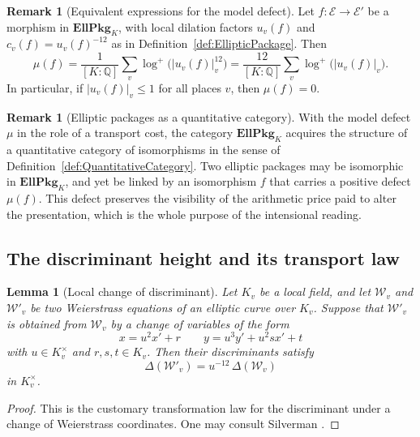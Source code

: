 \documentclass[10pt, reqno]{amsart}
\theoremstyle{plain}
\newtheorem{lemma}[theorem]{Lemma}
\theoremstyle{definition}
\newtheorem{remark}[theorem]{Remark}
\theoremstyle{plain}
\newcommand{\Q}{\mathbb{Q}}
\begin{document}
\begin{remark}[Equivalent expressions for the model defect]\label{rem:ModelDefectEquivalent}
Let $f \colon \mathcal{E}\to\mathcal{E}'$ be a morphism in $\mathbf{EllPkg}_K$, with local dilation factors $u_v(f)$ and $c_v(f)=u_v(f)^{-12}$ as in Definition~\ref{def:EllipticPackage}. Then
\[
\mu(f)
=
\frac{1}{[K:\Q]} \sum_v \log^{+}\!\bigl(|u_v(f)|_v^{12}\bigr)
=
\frac{12}{[K:\Q]} \sum_v \log^{+}\!\bigl(|u_v(f)|_v\bigr).
\]
In particular, if $|u_v(f)|_v\le 1$ for all places $v$, then $\mu(f)=0$.
\end{remark}

\begin{remark}[Elliptic packages as a quantitative category]\label{rem:EllPkgQuantitative}
With the model defect $\mu$ in the role of a transport cost, the category $\mathbf{EllPkg}_K$ acquires the structure of a quantitative category of isomorphisms in the sense of Definition~\ref{def:QuantitativeCategory}. Two elliptic packages may be isomorphic in $\mathbf{EllPkg}_K$, and yet be linked by an isomorphism $f$ that carries a positive defect $\mu(f)$. This defect preserves the visibility of the arithmetic price paid to alter the presentation, which is the whole purpose of the intensional reading.
\end{remark}

\subsection{The discriminant height and its transport law}\label{subsec:DiscriminantHeight}

\begin{lemma}[Local change of discriminant]\label{lem:LocalDiscriminantChange}
Let $K_v$ be a local field, and let $\mathcal{W}_v$ and $\mathcal{W}'_v$ be two Weierstrass equations of an elliptic curve over $K_v$. Suppose that $\mathcal{W}'_v$ is obtained from $\mathcal{W}_v$ by a change of variables of the form
\[
  x = u^2 x' + r
  \qquad
  y = u^3 y' + u^2 s x' + t
\]
with $u \in K_v^{\times}$ and $r,s,t \in K_v$. Then their discriminants satisfy
\[
  \Delta(\mathcal{W}'_v) = u^{-12}\,\Delta(\mathcal{W}_v)
\]
in $K_v^\times$.
\end{lemma}

\begin{proof}
This is the customary transformation law for the discriminant under a change of Weierstrass coordinates. One may consult Silverman \cite[III, Proposition~1.1]{SilvermanAEC}.
\end{proof}
\end{document}

